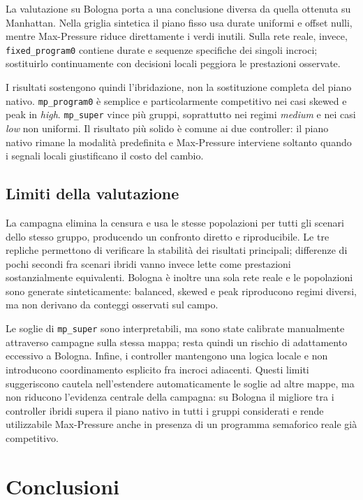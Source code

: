 \documentclass[12pt,a4paper,oneside]{report}
\numberwithin{equation}{chapter}
\begin{document}
La valutazione su Bologna porta a una conclusione diversa da quella ottenuta
su Manhattan. Nella griglia sintetica il piano fisso usa durate uniformi e
offset nulli, mentre Max-Pressure riduce direttamente i verdi inutili. Sulla
rete reale, invece, \texttt{fixed\_program0} contiene durate e sequenze
specifiche dei singoli incroci; sostituirlo continuamente con decisioni locali
peggiora le prestazioni osservate.

I risultati sostengono quindi l'ibridazione, non la sostituzione completa del
piano nativo. \texttt{mp\_program0} è semplice e particolarmente competitivo
nei casi skewed e peak in \emph{high}. \texttt{mp\_super} vince più gruppi, soprattutto
nei regimi \emph{medium} e nei casi \emph{low} non uniformi. Il risultato più solido è comune
ai due controller: il piano nativo rimane la modalità predefinita e
Max-Pressure interviene soltanto quando i segnali locali giustificano il costo
del cambio.

\section{Limiti della valutazione}

La campagna elimina la censura e usa le stesse popolazioni per tutti gli
scenari dello stesso gruppo, producendo un confronto diretto e riproducibile.
Le tre repliche permettono di verificare la stabilità dei risultati principali;
differenze di pochi secondi fra scenari ibridi vanno invece lette come
prestazioni sostanzialmente equivalenti. Bologna è inoltre una sola rete reale e
le popolazioni sono generate sinteticamente: balanced, skewed e peak
riproducono regimi diversi, ma non derivano da conteggi osservati sul campo.

Le soglie di \texttt{mp\_super} sono interpretabili, ma sono state calibrate
manualmente attraverso campagne sulla stessa mappa; resta quindi un rischio di
adattamento eccessivo a Bologna. Infine, i controller mantengono una logica
locale e non introducono coordinamento esplicito fra incroci adiacenti. Questi
limiti suggeriscono cautela nell'estendere automaticamente le soglie ad altre
mappe, ma non riducono l'evidenza centrale della campagna: su Bologna
il migliore tra i controller ibridi supera il piano nativo in tutti i gruppi
considerati e rende utilizzabile Max-Pressure anche in presenza di un programma
semaforico reale già competitivo.

\chapter{Conclusioni}
\label{chap:conclusioni}
\end{document}
